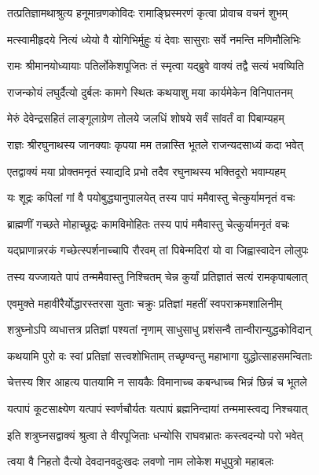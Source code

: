 \twolineshloka
{तत्प्रतिज्ञामथाश्रुत्य हनूमान्रणकोविदः}
{रामाङ्घ्रिस्मरणं कृत्वा प्रोवाच वचनं शुभम्}%

\twolineshloka
{मत्स्वामीहृदये नित्यं ध्येयो वै योगिभिर्मुहुः}
{यं देवाः सासुराः सर्वे नमन्ति मणिमौलिभिः}%

\twolineshloka
{रामः श्रीमानयोध्यायाः पतिर्लोकेशपूजितः}
{तं स्मृत्वा यद्ब्रुवे वाक्यं तद्वै सत्यं भवष्यिति}%

\twolineshloka
{राजन्कोयं लघुर्दैत्यो दुर्बलः कामगे स्थितः}
{कथयाशु मया कार्यमेकेन विनिपातनम्}%

\twolineshloka
{मेरुं देवेन्द्रसहितं लाङ्गूलाग्रेण तोलये}
{जलधिं शोषये सर्वं सांवर्तं वा पिबाम्यहम्}%

\twolineshloka
{राज्ञः श्रीरघुनाथस्य जानक्याः कृपया मम}
{तन्नास्ति भूतले राजन्यदसाध्यं कदा भवेत्}%

\twolineshloka
{एतद्वाक्यं मया प्रोक्तमनृतं स्याद्यदि प्रभो}
{तदैव रघुनाथस्य भक्तिदूरो भवाम्यहम्}%

\twolineshloka
{यः शूद्रः कपिलां गां वै पयोबुद्ध्यानुपालयेत्}
{तस्य पापं ममैवास्तु चेत्कुर्यामनृतं वचः}%

\twolineshloka
{ब्राह्मणीं गच्छते मोहाच्छूद्रः कामविमोहितः}
{तस्य पापं ममैवास्तु चेत्कुर्यामनृतं वचः}%

\twolineshloka
{यद्घ्राणान्नरकं गच्छेत्स्पर्शनाच्चापि रौरवम्}
{तां पिबेन्मदिरां यो वा जिह्वास्वादेन लोलुपः}%

\twolineshloka
{तस्य यज्जायते पापं तन्ममैवास्तु निश्चितम्}
{चेन्न कुर्यां प्रतिज्ञातं सत्यं रामकृपाबलात्}%

\twolineshloka
{एवमुक्ते महावीरैर्योद्धारस्तरसा युताः}
{चक्रुः प्रतिज्ञां महतीं स्वपराक्रमशालिनीम्}%

\twolineshloka
{शत्रुघ्नोऽपि व्यधात्तत्र प्रतिज्ञां पश्यतां नृणाम्}
{साधुसाधु प्रशंसन्वै तान्वीरान्युद्धकोविदान्}%

\twolineshloka
{कथयामि पुरो वः स्वां प्रतिज्ञां सत्त्वशोभिताम्}
{तच्छृण्वन्तु महाभागा युद्धोत्साहसमन्विताः}%

\twolineshloka
{चेत्तस्य शिर आहत्य पातयामि न सायकैः}
{विमानाच्च कबन्धाच्च भिन्नं छिन्नं च भूतले}%

\twolineshloka
{यत्पापं कूटसाक्ष्येण यत्पापं स्वर्णचौर्यतः}
{यत्पापं ब्रह्मनिन्दायां तन्ममास्त्वद्य निश्चयात्}%

\twolineshloka
{इति शत्रुघ्नसद्वाक्यं श्रुत्वा ते वीरपूजिताः}
{धन्योसि राघवभ्रातः कस्त्वदन्यो परो भवेत्}%

\twolineshloka
{त्वया वै निहतो दैत्यो देवदानवदुःखदः}
{लवणो नाम लोकेश मधुपुत्रो महाबलः}%

